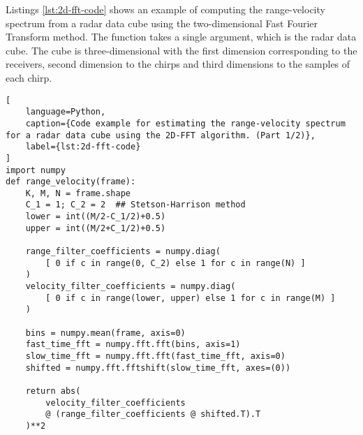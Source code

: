 Listings \ref{lst:2d-fft-code} shows an example of computing the range-velocity spectrum from a radar data cube using the two-dimensional Fast Fourier Transform method.
The function takes a single argument, which is the radar data cube.
The cube is three-dimensional with the first dimension corresponding to the receivers,
second dimension to the chirps and third dimensions to the samples of each chirp.

\begin{lstlisting}[
    language=Python,
    caption={Code example for estimating the range-velocity spectrum for a radar data cube using the 2D-FFT algorithm. (Part 1/2)},
    label={lst:2d-fft-code}
]
import numpy
def range_velocity(frame):
    K, M, N = frame.shape
    C_1 = 1; C_2 = 2  ## Stetson-Harrison method
    lower = int((M/2-C_1/2)+0.5)
    upper = int((M/2+C_1/2)+0.5)

    range_filter_coefficients = numpy.diag(
        [ 0 if c in range(0, C_2) else 1 for c in range(N) ]
    )
    velocity_filter_coefficients = numpy.diag(
        [ 0 if c in range(lower, upper) else 1 for c in range(M) ]
    )

    bins = numpy.mean(frame, axis=0)
    fast_time_fft = numpy.fft.fft(bins, axis=1)
    slow_time_fft = numpy.fft.fft(fast_time_fft, axis=0)
    shifted = numpy.fft.fftshift(slow_time_fft, axes=(0))
    
    return abs(
        velocity_filter_coefficients 
        @ (range_filter_coefficients @ shifted.T).T
    )**2
\end{lstlisting}